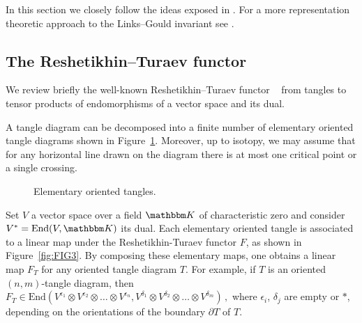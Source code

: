 \documentclass[12pt,reqno]{amsart}
\theoremstyle{definition}
\def\BK{\mathbbm K}
\def\End{\mathrm{End}}
\def\RT{F}
\def\tangle{T}
\begin{document}
In this section we closely follow the ideas exposed in \cite{GHKST, GHKKST}. For a more representation theoretic approach to the Links--Gould invariant see \cite{DWKL,GHKW}. 

\subsection{The Reshetikhin--Turaev functor}
\label{sub:RT}

We review briefly the well-known Reshetikhin--Turaev functor
~\cite{RT:ribbon,Tu:book} from tangles to tensor products of endomorphisms of a vector
space and its dual. 
  
A tangle diagram can be decomposed into a finite number of elementary
oriented tangle diagrams shown in Figure~\ref{fig:tangles1}. Moreover, up to
  isotopy, we may assume that for any horizontal line drawn on the diagram there is
  at most one critical point or a single crossing.

  \begin{figure}[htpb!]
\caption{Elementary oriented tangles.}
\label{fig:tangles1}
\end{figure}

Set $V$ a vector space over a field $\BK$ of characteristic zero and consider
$V^\ast = \End(V,\BK)$ its dual. Each elementary oriented tangle is associated
to a linear map under the Reshetikhin-Turaev functor
$\RT$, as shown in Figure~\ref{fig:FIG3}. By composing these elementary maps, one obtains a linear map $\RT_\tangle$
for any oriented tangle diagram $\tangle$.
For example, if $\tangle$ is an oriented $(n,m)$-tangle diagram, then
$
\RT_{\tangle} \in \End(V^{\epsilon_1} \otimes V^{\epsilon_2} \otimes \ldots
\otimes V^{\epsilon_n}, V^{\delta_1} \otimes V^{\delta_2} \otimes \ldots
\otimes V^{\delta_m}) \,,
$
where $\epsilon_i$, $\delta_j$ are empty or $\ast$, depending on the
orientations of the boundary $\partial T$ of $T$.
\end{document}
